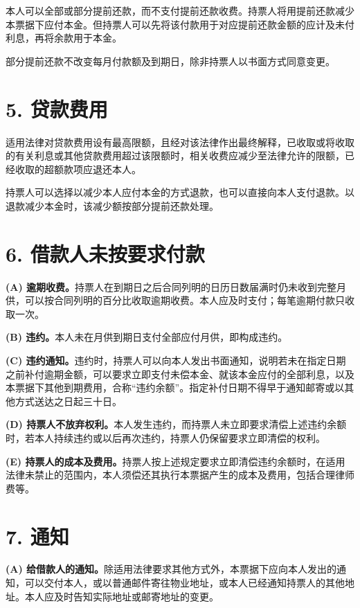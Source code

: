 \documentclass[UTF8,fontset=none,11pt,a4paper]{ctexart}
\begin{document}
本人可以全部或部分提前还款，而不支付提前还款收费。持票人将用提前还款减少本票据下应付本金。但持票人可以先将该付款用于对应提前还款金额的应计及未付利息，再将余款\allowbreak\mbox{用于本金。}


部分提前还款不改变每月付款额及到期日，除非持票人以书面方式\allowbreak\mbox{同意变更。}


\section*{5. 贷款费用}
适用法律对贷款费用设有最高限额，且经对该法律作出最终解释，已收取或将收取的有关利息或其他贷款费用超过该限额时，相关收费应减少至法律允许的限额，已经收取的超额款项应\allowbreak\mbox{退还本人。}


持票人可以选择以减少本人应付本金的方式退款，也可以直接向本人支付退款。以退款减少本金时，该减少额按部分提前\allowbreak\mbox{还款处理。}


\section*{6. 借款人未按要求付款}
\textbf{(A) 逾期收费。}持票人在到期日之后合同列明的日历日数届满时仍未收到完整月供，可以按合同列明的百分比收取逾期收费。本人应及时支付；每笔逾期付款只\allowbreak\mbox{收取一次。}


\textbf{(B) 违约。}本人未在月供到期日支付全部应付月供，即\allowbreak\mbox{构成违约。}


\textbf{(C) 违约通知。}违约时，持票人可以向本人发出书面通知，说明若未在指定日期之前补付逾期金额，可以要求立即支付未偿本金、就该本金应付的全部利息，以及本票据下其他到期费用，合称“违约余额”。指定补付日期不得早于通知邮寄或以其他方式送达之日\allowbreak\mbox{起三十日。}


\textbf{(D) 持票人不放弃权利。}本人发生违约，而持票人未立即要求清偿上述违约余额时，若本人持续违约或以后再次违约，持票人仍保留要求立即清\allowbreak\mbox{偿的权利。}


\textbf{(E) 持票人的成本及费用。}持票人按上述规定要求立即清偿违约余额时，在适用法律未禁止的范围内，本人须偿还其执行本票据产生的成本及费用，包括合理\allowbreak\mbox{律师费等。}


\section*{7. 通知}
\textbf{(A) 给借款人的通知。}除适用法律要求其他方式外，本票据下应向本人发出的通知，可以交付本人，或以普通邮件寄往物业地址，或本人已经通知持票人的其他地址。本人应及时告知实际地址或邮寄地\allowbreak\mbox{址的变更。}
\end{document}

